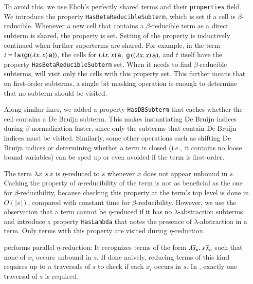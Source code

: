 To avoid this, we use Ehoh's perfectly shared
terms and their \texttt{properties} field.
%
We introduce the property \texttt{HasBetaReducibleSubterm}, which is set if
a cell is $\beta$-reducible.
Whenever a new cell that contains a
$\beta$-reducible term as a direct subterm is shared, the property is set.
Setting of the property is inductively continued when further superterms are
shared. For example, in the term $t = \mathsf{f} \, \mathsf{a} \, (\mathsf{g} ((\lambda x.\,
x)\,\mathsf{a}))$, the cells for $(\lambda x.\, x)\,\mathsf{a}$,
$\mathsf{g}\,((\lambda x.\, x)\,\mathsf{a})$, and $t$ itself have the property
\texttt{HasBetaReducibleSubterm} set.
%
When it needs to find $\beta$-reducible subterms, \ehohii{} will visit only the
cells with this property set. This further means that on first-order
subterms, a single bit masking operation is enough to determine that no subterm
should be visited.

Along similar lines, we added a property \texttt{HasDBSubterm} that
caches whether the cell contains a De Bruijn subterm. This
makes
instantiating De Bruijn indices during $\beta$-norma\-lization faster, since only the
subterms that contain De Bruijn indices must be visited. Similarly, some other
operations such as shifting De Bruijn indices or determining whether a term is closed
(i.e., it contains no loose bound variables) can be sped up or even avoided
if the term is first-order.

The term $\lambda x.\, s \, x$ is $\eta$-reduced to $s$ whenever $x$ does not appear
unbound in $s$. Caching the property of $\eta$-reducibility of the term is not
as beneficial as the one for $\beta$-reducibility, because checking this
property at the term's top level is done in $O(|s|)$, compared with constant time
for $\beta$-reducibility.
However, we use the observation that a term cannot be $\eta$-reduced if it has
no $\lambda$-abstraction subterms and introduce a property \texttt{HasLambda}
that notes the presence of $\lambda$-abstraction in a term. Only
terms with this property are visited during $\eta$-reduction.

\ehohii{} performs parallel $\eta$-reduction: It recognizes terms of the form
$\lambda \overline{x}_n.\> s \, \overline{x}_n  $ such that none of $x_i$
occurs unbound in $s$. If done naively, reducing terms of this kind requires up to $n$
traversals of $s$ to check if each $x_i$ occurs in $s$. In \ehohii{}, exactly one
traversal of $s$ is required.

